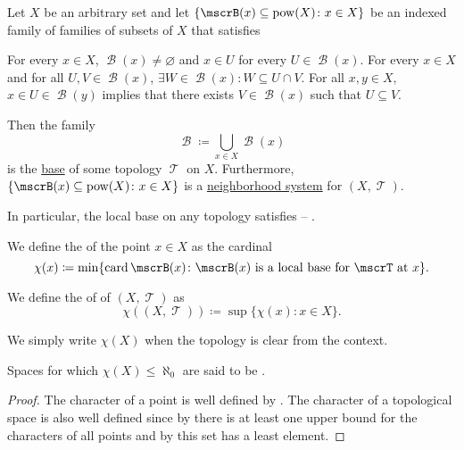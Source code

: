 \begin{proposition}\label{thm:topological_local_base_axioms}\mcite\cite[13]{Engelking1989}
  Let \( X \) be an arbitrary set and let \( \{ \mscrB(x) \subseteq \pow(X) \colon x \in X \} \) be an indexed family of families of subsets of \( X \) that satisfies
  \begin{thmenum}
     For every \( x \in X \), \( \mscrB(x) \neq \varnothing \) and \( x \in U \) for every \( U \in \mscrB(x) \).
     For every \( x \in X \) and for all \( U, V \in \mscrB(x) \), \( \exists W \in \mscrB(x): W \subseteq U \cap V \).
     For all \( x, y \in X \), \( x \in U \in \mscrB(y) \) implies that there exists \( V \in \mscrB(x) \) such that \( U \subseteq V \).
  \end{thmenum}

  Then the family
  \begin{equation*}
    \mscrB \coloneqq \bigcup_{x \in X} \mscrB(x)
  \end{equation*}
  is the \hyperref[thm:topological_base_axioms]{base} of some topology \( \mscrT \) on \( X \). Furthermore, \( \{ \mscrB(x) \subseteq \pow(X) \colon x \in X \} \) is a \hyperref[def:topological_local_base]{neighborhood system} for \( (X, \mscrT) \).

  In particular, the local base on any topology satisfies  -- .
\end{proposition}

\begin{definition}\label{def:topological_space_character}
  We define the  of the point \( x \in X \) as the cardinal
  \begin{equation*}
    \chi(x) \coloneqq \min \{ \card \mscrB(x) \colon \mscrB(x) \text{ is a local base for } \mscrT \text{ at } x \}.
  \end{equation*}

  We define the  of of \( (X, \mscrT) \) as
  \begin{equation*}
    \chi((X, \mscrT)) \coloneqq \sup \{ \chi(x) \colon x \in X \}.
  \end{equation*}

  We simply write \( \chi(X) \) when the topology is clear from the context.

  Spaces for which \( \chi(X) \leq \aleph_0 \) are said to be .
\end{definition}
\begin{proof}
  The character of a point is well defined by . The character of a topological space is also well defined since by  there is at least one upper bound for the characters of all points and by  this set has a least element.
\end{proof}

